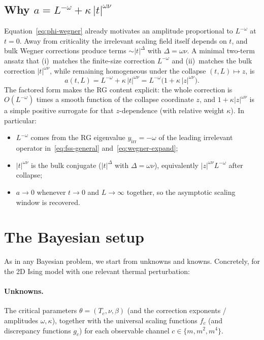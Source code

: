 \documentclass[11pt]{article}
\begin{document}
\subsection{Why $a = L^{-\omega} + \kappa\,|t|^{\omega\nu}$}

Equation~\eqref{eq:phi-wegner} already motivates an amplitude proportional
to $L^{-\omega}$ at $t=0$.
Away from criticality the irrelevant scaling field itself depends on $t$,
and bulk Wegner corrections produce terms $\sim |t|^{\Delta}$ with
$\Delta = \omega\nu$.
A minimal two-term ansatz that (i)~matches the finite-size correction
$L^{-\omega}$ and (ii)~matches the bulk correction $|t|^{\omega\nu}$, while
remaining homogeneous under the collapse $(t,L)\mapsto z$, is
\begin{equation}
  \label{eq:a-fss}
  a(t,L)
    = L^{-\omega} + \kappa\, |t|^{\omega\nu}
    = L^{-\omega}\bigl(1 + \kappa\, |z|^{\omega\nu}\bigr).
\end{equation}
The factored form makes the RG content explicit: the whole correction is
$O(L^{-\omega})$ times a smooth function of the collapse coordinate $z$,
and $1+\kappa|z|^{\omega\nu}$ is a simple positive surrogate for that
$z$-dependence (with relative weight $\kappa$).
In particular:
\begin{itemize}
  \item $L^{-\omega}$ comes from the RG eigenvalue $y_{\mathrm{irr}}=-\omega$ of
    the leading irrelevant operator in~\eqref{eq:fss-general}
    and~\eqref{eq:wegner-expand};
  \item $|t|^{\omega\nu}$ is the bulk conjugate
    ($|t|^{\Delta}$ with $\Delta=\omega\nu$), equivalently
    $|z|^{\omega\nu} L^{-\omega}$ after collapse;
  \item $a\to 0$ whenever $t\to 0$ and $L\to\infty$ together, so the
    asymptotic scaling window is recovered.
\end{itemize}

\section{The Bayesian setup}

As in any Bayesian problem, we start from unknowns and knowns.
Concretely, for the 2D Ising model with one relevant thermal
perturbation:

\paragraph{Unknowns.}
The critical parameters $\theta = (T_c,\nu,\beta)$ (and the correction
exponents / amplitudes $\omega,\kappa$), together with the universal
scaling functions $f_c$ (and discrepancy functions $g_c$) for each
observable channel $c\in\{m,m^2,m^4\}$.
\end{document}
